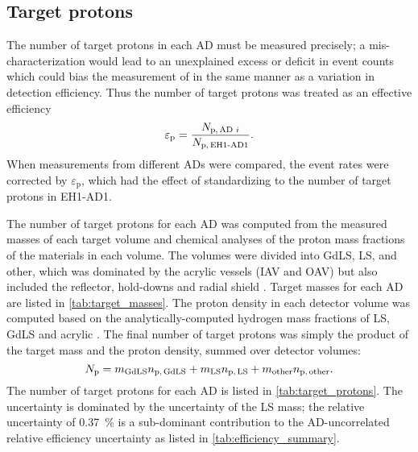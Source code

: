\subsection{Target protons}
\label{subsec:target_mass}

The number of target protons in each AD must be measured precisely;
a mis-characterization would lead to an unexplained excess or deficit
in event counts which could bias the measurement of \thetaot{}
in the same manner as a variation in detection efficiency.
Thus the number of target protons was treated as an effective efficiency
\begin{equation}\label{eq:target_protons_eff}
    \varepsilon_\text{p} = \frac{N_{\text{p,\,AD }i}}{N_\text{p,\,EH1-AD1}}.
\end{equation}
When measurements from different ADs were compared,
the event rates were corrected by $\varepsilon_\text{p}$,
which had the effect of standardizing to the number of target protons in EH1-AD1.

The number of target protons for each AD was computed from the measured masses
of each target volume
and chemical analyses of the proton mass fractions
of the materials in each volume.
The volumes were divided into GdLS, LS, and other,
which was dominated by the acrylic vessels (IAV and OAV)
but also included the reflector, hold-downs and radial shield \cite{acrylic_mass}.
Target masses for each AD are listed in \cref{tab:target_masses}.
The proton density in each detector volume
was computed based on the analytically-computed
hydrogen mass fractions of LS, GdLS and acrylic \cite{target_protons_technote}.
The final number of target protons was
simply the product of the target mass and the proton density,
summed over detector volumes:
\begin{equation}\label{eq:target_protons}
    N_\text{p} = m_\text{GdLS} n_\text{p,\,GdLS}
    + m_\text{LS} n_\text{p,\,LS}
    + m_\text{other} n_\text{p,\,other}.
\end{equation}
The number of target protons for each AD
is listed in \cref{tab:target_protons}.
The uncertainty is dominated by the uncertainty of the LS mass;
the relative uncertainty of \SI{0.37}{\percent}
is a sub-dominant contribution to the AD-uncorrelated
relative efficiency uncertainty
as listed in \cref{tab:efficiency_summary}.


